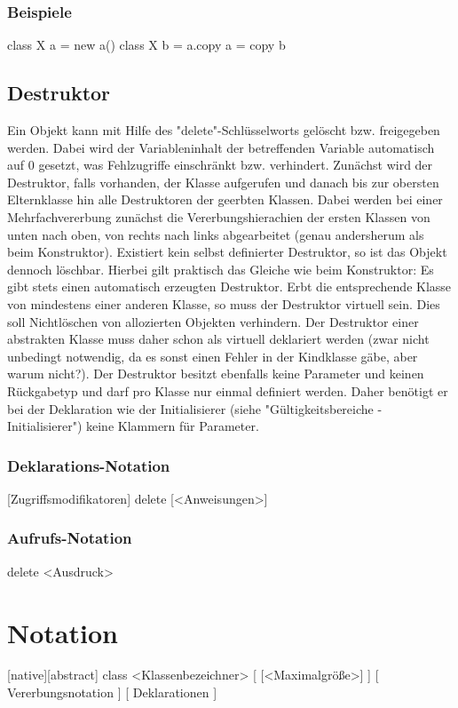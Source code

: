 \subsubsection{Beispiele}
class X a = new a()
class X b = a.copy
a = copy b

\subsection{Destruktor}
Ein Objekt kann mit Hilfe des "delete"-Schlüsselworts gelöscht bzw. freigegeben werden.
Dabei wird der Variableninhalt der betreffenden Variable automatisch auf 0 gesetzt, was Fehlzugriffe einschränkt bzw. verhindert.
Zunächst wird der Destruktor, falls vorhanden, der Klasse aufgerufen und danach bis zur obersten Elternklasse hin alle Destruktoren
der geerbten Klassen. Dabei werden bei einer Mehrfachvererbung zunächst die Vererbungshierachien der ersten Klassen von unten nach oben,
von rechts nach links abgearbeitet (genau andersherum als beim Konstruktor).
Existiert kein selbst definierter Destruktor, so ist das Objekt dennoch löschbar. Hierbei gilt praktisch das Gleiche wie beim Konstruktor:
Es gibt stets einen automatisch erzeugten Destruktor.
Erbt die entsprechende Klasse von mindestens einer anderen Klasse, so muss der Destruktor virtuell sein. Dies soll Nichtlöschen von allozierten
Objekten verhindern.
Der Destruktor einer abstrakten Klasse muss daher schon als virtuell deklariert werden (zwar nicht unbedingt notwendig, da es sonst einen Fehler in
der Kindklasse gäbe, aber warum nicht?).
Der Destruktor besitzt ebenfalls keine Parameter und keinen Rückgabetyp und darf pro Klasse nur einmal definiert werden.
Daher benötigt er bei der Deklaration wie der Initialisierer (siehe "Gültigkeitsbereiche - Initialisierer") keine Klammern für Parameter.

\subsubsection{Deklarations-Notation}
[Zugriffsmodifikatoren] delete
	[<Anweisungen>]

\subsubsection{Aufrufs-Notation}
delete <Ausdruck>

\section{Notation}
[native][abstract] class <Klassenbezeichner> [ [<Maximalgröße>] ] [ Vererbungsnotation ]
	[ Deklarationen ]